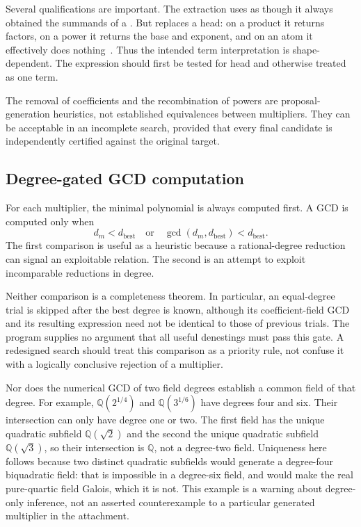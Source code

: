 \documentclass[11pt,letterpaper]{article}
\newcommand{\code}[1]{\texttt{\detokenize{#1}}}
\newcommand{\Q}{\mathbb{Q}}
\theoremstyle{definition}
\begin{document}
Several qualifications are important. The extraction uses
\code{List @@ Expand[...]} as though it always obtained the summands of a
\code{Plus}. But \code{Apply} replaces a head: on a product it returns factors,
on a power it returns the base and exponent, and on an atom it effectively does
nothing~\cite{doc-apply}. Thus the intended term interpretation is shape-dependent.
The expression should first be tested for head \code{Plus} and otherwise treated
as one term.

The removal of coefficients and the recombination of powers are proposal-generation
heuristics, not established equivalences between multipliers. They can be acceptable
in an incomplete search, provided that every final candidate is independently
certified against the original target.

\subsection{Degree-gated GCD computation}
For each multiplier, the minimal polynomial is always computed first. A GCD is
computed only when
\[
  d_m<d_{\mathrm{best}}
  \quad\text{or}\quad
  \gcd(d_m,d_{\mathrm{best}})<d_{\mathrm{best}}.
\]
The first comparison is useful as a heuristic because a rational-degree reduction
can signal an exploitable relation. The second is an attempt to exploit
incomparable reductions in degree.

Neither comparison is a completeness theorem. In particular, an equal-degree
trial is skipped after the best degree is known, although its coefficient-field
GCD and its resulting expression need not be identical to those of previous trials.
The program supplies no argument that all useful denestings must pass this gate.
A redesigned search should treat this comparison as a priority rule, not confuse it
with a logically conclusive rejection of a multiplier.

Nor does the numerical GCD of two field degrees establish a common field of that
degree. For example, $\Q(2^{1/4})$ and $\Q(3^{1/6})$ have degrees four and six.
Their intersection can only have degree one or two. The first field has the unique
quadratic subfield $\Q(\sqrt2)$ and the second the unique quadratic subfield
$\Q(\sqrt3)$, so their intersection is $\Q$, not a degree-two field. Uniqueness here
follows because two distinct quadratic subfields would generate a degree-four
biquadratic field: that is impossible in a degree-six field, and would make the
real pure-quartic field Galois, which it is not. This example is a warning about
degree-only inference, not an asserted counterexample to a particular generated
multiplier in the attachment.
\end{document}
